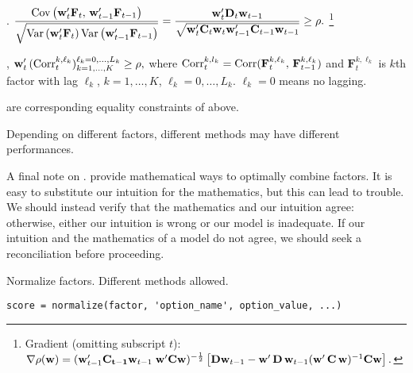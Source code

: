 \begin{enumerate*}
\begin{itemize*}
\begin{enumerate*}
	      \item {}.
		       $\displaystyle
		        \frac{\operatorname{Cov}\left(\mathbf{w}_t'\mathbf{F}_t,\,\mathbf{w}_{t-1}'\mathbf{F}_{t-1}\right)}
		         {\sqrt{\operatorname{Var}\left(\mathbf{w}_t'\mathbf{F}_t\right)\operatorname{Var}\left(\mathbf{w}_{t-1}'\mathbf{F}_{t-1}\right)}}
             =\frac{\mathbf{w}_t'\mathbf{D}_t\mathbf{w}_{t-1}}{\sqrt{\mathbf{w}_t'\mathbf{C}_t\mathbf{w}_t{\mathbf{w}_{t-1}'\mathbf{C}_{t-1}\mathbf{w}_{t-1}}}} \geq \rho.
		       $
             \footnote{Gradient (omitting subscript $t$):
             $\nabla\rho(\mathbf{w}) =
              (\mathbf{w}_{t-1}'\mathbf{C_{t-1}}\mathbf{w}_{t-1}\;
               \mathbf{w}'\mathbf{C}\mathbf{w})^{-\frac{1}{2}}\left[\mathbf{D}\mathbf{w}_{t-1}-
               \mathbf{w}'\,\mathbf{D}\,\mathbf{w}_{t-1}(\mathbf{w}'\,\mathbf{C}\,\mathbf{w})^{-1}\mathbf{C}\mathbf{w}\right].$}

         \item {},
            $\displaystyle
               \mathbf{w}'_t\,(\operatorname{Corr}_t^{k,\ell_k})_{k=1,\ldots,K}^{\ell_k=0,\ldots,L_k} \geq \rho,
            $
          where $\operatorname{Corr}_t^{k,l_k} = \operatorname{Corr}(\mathbf{F}_t^{k,\ell_k},\,\mathbf{F}_{t-1}^{k,\ell_k})$ 
          and $\mathbf{F}_t^{k,\ell_k}$ is $k$th factor with lag $\ell_k$, $k=1,\ldots,K$, 
          $\ell_k=0,\ldots,L_k$. 
          $\ell_k=0$ means no lagging.
          
	      \item {} are corresponding equality constraints of above.
	      \end{enumerate*}
      \end{itemize*}
      Depending on different factors, different methods may have different performances. 
\end{enumerate*}

A final note on .
 provide mathematical ways to optimally combine factors.
It is easy to substitute our intuition for the mathematics, but this can lead to trouble.
We should instead verify that the mathematics and our intuition agree: 
otherwise, either our intuition is wrong or our model is inadequate.
If our intuition and the mathematics of a model do not agree,
we should seek a reconciliation before proceeding.

  Normalize factors. Different methods allowed.

\usage
   \begin{lstlisting}[numbers=none]
   score = normalize(factor, 'option_name', option_value, ...)
   \end{lstlisting}


